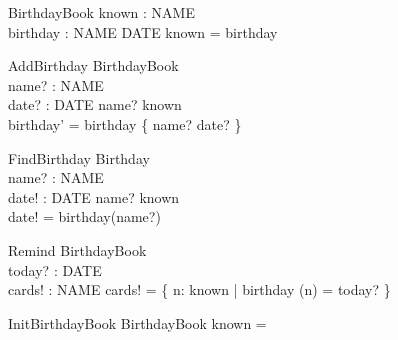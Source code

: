 \documentclass{llncs}
\begin{document}
\begin{zed}
\end{zed}

\begin{schema}{BirthdayBook}
known : \power NAME \\
birthday : NAME \pfun DATE
\where 
known = \dom birthday
\end{schema}

\begin{schema}{AddBirthday}
\Delta BirthdayBook \\
name? : NAME \\
date? : DATE
\where
name? \notin known \\
birthday' = birthday \cup \{ name? \mapsto date? \}
\end{schema}

\begin{schema}{FindBirthday}
\Xi Birthday \\
name? : NAME \\
date! : DATE
\where 
name? \mem known \\
date! = birthday(name?)
\end{schema}

\begin{schema}{Remind}
\Xi BirthdayBook \\
today? : DATE \\
cards! : \power NAME
\where
cards! = \{ n: known | birthday (n)  = today? \}
\end{schema}

\begin{schema}{InitBirthdayBook}
BirthdayBook 
\where
known = \emptyset
\end{schema}
\end{document}
